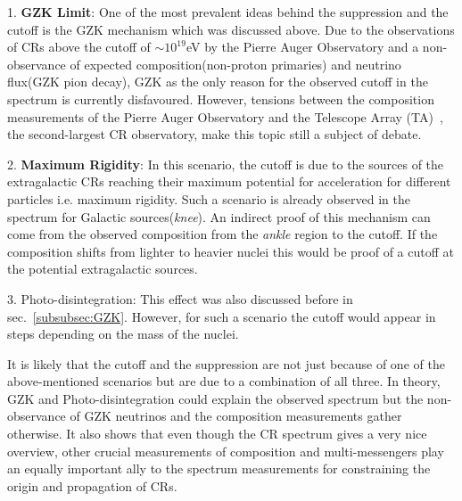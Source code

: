 1. \textbf{GZK Limit}: One of the most prevalent ideas behind the suppression and the cutoff is the GZK mechanism which was discussed above. Due to the observations of CRs above the cutoff of $\sim 10^{19}$eV by the Pierre Auger Observatory and a non-observance of expected composition(non-proton primaries) and neutrino flux(GZK pion decay), GZK as the only reason for the observed cutoff in the spectrum is currently disfavoured. However, tensions between the composition measurements of the Pierre Auger Observatory and the Telescope Array (TA)~\cite{kawai2008telescope}, the second-largest CR observatory, make this topic still a subject of debate.

2. \textbf{Maximum Rigidity}: In this scenario, the cutoff is due to the sources of the extragalactic CRs reaching their maximum potential for acceleration for different particles i.e. maximum rigidity. Such a scenario is already observed in the spectrum for Galactic sources(\textit{knee}). An indirect proof of this mechanism can come from the observed composition from the \textit{ankle} region to the cutoff. If the composition shifts from lighter to heavier nuclei this would be proof of a cutoff at the potential extragalactic sources. 

3. Photo-disintegration: This effect was also discussed before in sec.~\ref{subsubsec:GZK}. However, for such a scenario the cutoff would appear in steps depending on the mass of the nuclei. 

It is likely that the cutoff and the suppression are not just because of one of the above-mentioned scenarios but are due to a combination of all three. In theory, GZK and Photo-disintegration could explain the observed spectrum but the non-observance of GZK neutrinos and the composition measurements gather otherwise. It also shows that even though the CR spectrum gives a very nice overview, other crucial measurements of composition and multi-messengers play an equally important ally to the spectrum measurements for constraining the origin and propagation of CRs.

